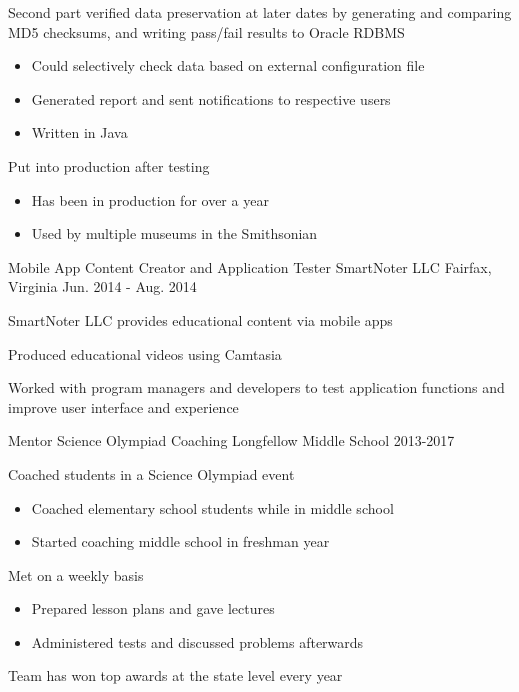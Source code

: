 \begin{cventries}
{\begin{cvitems}
        \item {Second part verified data preservation at later dates by generating and comparing MD5 checksums, and writing pass/fail results to Oracle RDBMS}
        \begin{itemize}
            \item{Could selectively check data based on external configuration file}
            \item{Generated report and sent notifications to respective users}
            \item{Written in Java}
        \end{itemize}
        \item{Put into production after testing}
        \begin{itemize}
            \item{Has been in production for over a year}
            \item{Used by multiple museums in the Smithsonian}
        \end{itemize}
      \end{cvitems}
    }
    \cventry
    {Mobile App Content Creator and Application Tester}
    {SmartNoter LLC}
    {Fairfax, Virginia}
    {Jun. 2014 - Aug. 2014}
    {
        \begin{cvitems}
            \item{SmartNoter LLC provides educational content via mobile apps}
            \item{Produced educational videos using Camtasia}
            \item{Worked with program managers and developers to test application functions and improve user interface and experience}
        \end{cvitems}
    }
    \cventry
    {Mentor}
    {Science Olympiad Coaching}
    {Longfellow Middle School}
    {2013-2017}
    {
        \begin{cvitems}
        \item{Coached students in a Science Olympiad event}
        \begin{itemize}
            \item{Coached elementary school students while in middle school}
            \item{Started coaching middle school in freshman year}
        \end{itemize}
        \item{Met on a weekly basis}
        \begin{itemize}
            \item{Prepared lesson plans and gave lectures}
            \item{Administered tests and discussed problems afterwards}
        \end{itemize}
        \item{Team has won top awards at the state level every year}
        \end{cvitems}
    }
\end{cventries}
